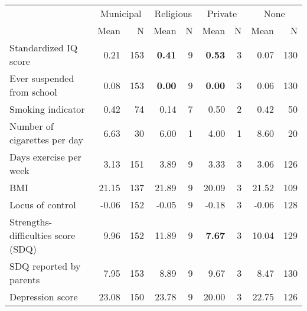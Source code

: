 \begin{tabular}{l r r r r r r r r}
\toprule
& \multicolumn{2}{c}{Municipal} & \multicolumn{2}{c}{Religious} & \multicolumn{2}{c}{Private} & \multicolumn{2}{c}{None} \\
& \scriptsize Mean & \scriptsize N & \scriptsize Mean & \scriptsize N & \scriptsize Mean & \scriptsize N & \scriptsize Mean & \scriptsize N \\
\midrule
Standardized IQ score &      0.21 &       153 & \textbf{     0.41} &         9 & \textbf{     0.53} &         3 &      0.07 &       130 \\
Ever suspended from school &      0.08 &       153 & \textbf{     0.00} &         9 & \textbf{     0.00} &         3 &      0.06 &       130 \\
Smoking indicator &      0.42 &        74 &      0.14 &         7 &      0.50 &         2 &      0.42 &        50 \\
Number of cigarettes per day &      6.63 &        30 &      6.00 &         1 &      4.00 &         1 &      8.60 &        20 \\
Days exercise per week &      3.13 &       151 &      3.89 &         9 &      3.33 &         3 &      3.06 &       126 \\
BMI &     21.15 &       137 &     21.89 &         9 &     20.09 &         3 &     21.52 &       109 \\
Locus of control &     -0.06 &       152 &     -0.05 &         9 &     -0.18 &         3 &     -0.06 &       128 \\
Strengths-difficulties score (SDQ) &      9.96 &       152 &     11.89 &         9 & \textbf{     7.67} &         3 &     10.04 &       129 \\
SDQ reported by parents &      7.95 &       153 &      8.89 &         9 &      9.67 &         3 &      8.47 &       130 \\
Depression score &     23.08 &       150 &     23.78 &         9 &     20.00 &         3 &     22.75 &       126 \\
\bottomrule
\end{tabular}
